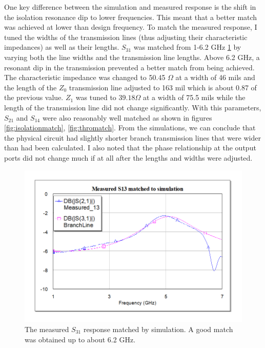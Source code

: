 \documentclass[twocolumn, aps, apl]{revtex4-1}
\begin{document}
One key difference between the simulation and measured response is the shift in the isolation resonance dip to lower frequencies. This meant that a better match was achieved at lower than design frequency. To match the measured response, I tuned the widths of the transmission lines (thus adjusting their characteristic impedances) as well as their lengths. $S_{31}$ was matched from 1-6.2 GHz \ref{fig:coupmatch} by varying both the line widths and the transmission line lengths. Above 6.2 GHz, a resonant dip in the transmission prevented a better match from being achieved. The characteristic impedance was changed to 50.45 $\Omega$ at a width of 46 mils and the length of the $Z_0$ transmission line adjusted to 163 mil which is about 0.87 of the previous value. $Z_1$ was tuned to $39.18 \Omega$ at a width of 75.5 mils while the length of the transmission line did not change significantly. With this parameters, $S_{21}$ and $S_{14}$ were also reasonably well matched as shown in figures \ref{fig:isolationmatch}, \ref{fig:thromatch}. From the simulations, we can conclude that the physical circuit had slightly shorter branch transmission lines that were wider than had been calculated. I also noted that the phase relationship at the output ports did not change much if at all after the lengths and widths were adjusted.

\begin{figure}[!htbp]
    \centering
    \includegraphics[scale=0.4]{CoupledMatch.png}
    \caption{The measured $S_{31}$ response matched by simulation. A good match was obtained up to about 6.2 GHz. }
    \label{fig:coupmatch}
\end{figure}
\end{document}
